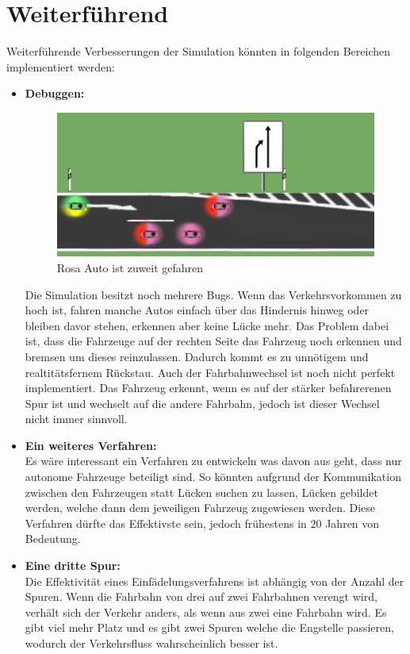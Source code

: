 \chapter{Weiterführend}
Weiterführende Verbesserungen der Simulation könnten in folgenden Bereichen implementiert werden:
\begin{itemize}
	\item \textbf{Debuggen:}
	\begin{figure}
		\centering
		\includegraphics[width=0.7\linewidth]{images/BUG}
		\caption{Rosa Auto ist zuweit gefahren}
		\label{fig:bug}
	\end{figure}

Die Simulation besitzt noch mehrere Bugs. Wenn das Verkehrsvorkommen zu hoch ist, fahren manche Autos einfach über das Hindernis hinweg oder bleiben davor stehen, erkennen aber keine Lücke mehr. Das Problem dabei ist, dass die Fahrzeuge auf der rechten Seite das Fahrzeug noch erkennen und bremsen um dieses reinzulassen. Dadurch kommt es zu unnötigem und realtitätsfernem Rückstau.
Auch der Fahrbahnwechsel ist noch nicht perfekt implementiert. Das Fahrzeug erkennt, wenn es auf der stärker befahrerenen Spur ist und wechselt auf die andere Fahrbahn, jedoch ist dieser Wechsel nicht immer sinnvoll.
\item \textbf{Ein weiteres Verfahren:}\\
Es wäre interessant ein Verfahren zu entwickeln was davon aus geht, dass nur autonome Fahrzeuge beteiligt sind. So könnten aufgrund der Kommunikation zwischen den Fahrzeugen statt Lücken suchen zu lassen, Lücken  gebildet werden, welche dann dem jeweiligen Fahrzeug zugewiesen werden. Diese Verfahren dürfte das Effektivste sein, jedoch frühestens in 20 Jahren von Bedeutung.

\item \textbf{Eine dritte Spur:}\\
Die Effektivität eines Einfädelungsverfahrens ist abhängig von der Anzahl der Spuren. Wenn die Fahrbahn von drei auf zwei Fahrbahnen verengt wird, verhält sich der Verkehr anders, als wenn aus zwei eine Fahrbahn wird. Es gibt viel mehr Platz und es gibt zwei Spuren welche die Engstelle passieren, wodurch der Verkehrsfluss wahrscheinlich besser ist.


\end{itemize}
